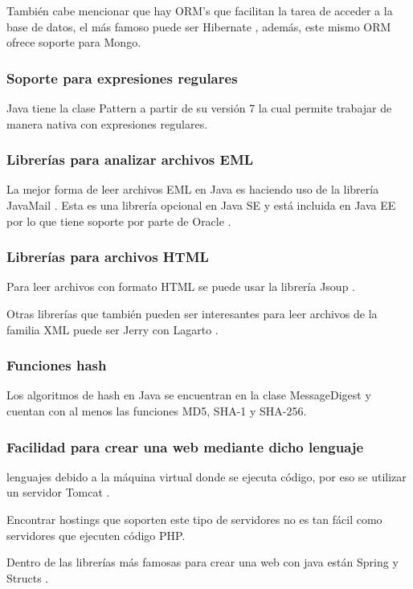 También cabe mencionar que hay ORM’s que facilitan la tarea de acceder a la base de datos, el más famoso puede ser Hibernate \cite{Hibernate}, además, este mismo ORM ofrece soporte para Mongo. 

\subsubsection{Soporte para expresiones regulares}
Java tiene la clase Pattern \cite{java_Pattern_class} a partir de su versión 7 la cual permite trabajar de manera nativa con expresiones regulares. 

\subsubsection{Librerías para analizar archivos EML}
La mejor forma de leer archivos EML en Java es haciendo uso de la librería JavaMail \cite{JavaMail}. Esta es una librería opcional en Java SE y está incluida en Java EE por lo que tiene soporte por parte de Oracle \cite{java_JavaMail}.

\subsubsection{Librerías para archivos HTML}
Para leer archivos con formato HTML se puede usar la librería Jsoup \cite{jsoup}.

Otras librerías que también pueden ser interesantes para leer archivos de la familia XML puede ser Jerry \cite{jerry} con Lagarto \cite{jerry}.

\subsubsection{Funciones hash}
Los algoritmos de hash en Java se encuentran en la clase MessageDigest \cite{java_MessageDigest} y cuentan con al menos las funciones MD5, SHA-1 y SHA-256.

\subsubsection{Facilidad para crear una web mediante dicho lenguaje}
lenguajes debido a la máquina virtual donde se ejecuta código, por eso se utilizar un servidor Tomcat \cite{tomcat}.

Encontrar hostings que soporten este tipo de servidores no es tan fácil como servidores que ejecuten código PHP.

Dentro de las librerías más famosas para crear una web con java están Spring \cite{Spring} y Structs \cite{Struts}. 

